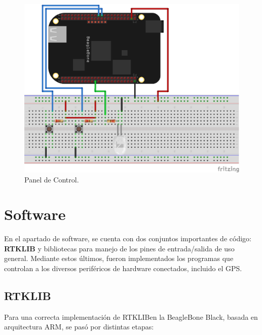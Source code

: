 \begin{figure}[H]
\centering
\includegraphics[scale=0.75]{Figures/ControlPanel}
\caption[Panel del Control.]{Panel de Control.}
\label{fig:ContPan}
\end{figure}

\newpage

\section{Software}

En el apartado de software, se cuenta con dos conjuntos importantes de código: \textbf{RTKLIB} y bibliotecas para manejo de los pines de entrada/salida de uso general. Mediante estos últimos, fueron implementados los programas que controlan a los diversos periféricos de hardware conectados, incluido el GPS.

\subsection{RTKLIB}

Para una correcta implementación de RTKLIB\footnotemark en la BeagleBone Black, basada en arquitectura ARM, se pasó por distintas etapas:\\


